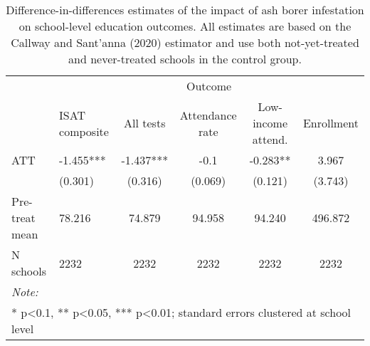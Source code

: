 \begin{table}[!h]

\caption{\label{tab:school-educ-table}Difference-in-differences estimates of the impact of ash borer infestation on school-level education outcomes. All estimates are based on the Callway and Sant'anna (2020) estimator and use both not-yet-treated and never-treated schools in the control group.}
\centering
\begin{tabular}[t]{llcccc}
\toprule
\multicolumn{1}{c}{ } & \multicolumn{5}{c}{Outcome} \\
\cmidrule(l{3pt}r{3pt}){2-6}
  & ISAT composite & All tests & Attendance rate & Low-income attend. & Enrollment\\
\midrule
ATT & -1.455*** & -1.437*** & -0.1 & -0.283** & 3.967\\
 & (0.301) & (0.316) & (0.069) & (0.121) & (3.743)\\
\midrule
Pre-treat mean & 78.216 & 74.879 & 94.958 & 94.240 & 496.872\\
N schools & 2232 & 2232 & 2232 & 2232 & 2232\\
\bottomrule
\multicolumn{6}{l}{\rule{0pt}{1em}\textit{Note: }}\\
\multicolumn{6}{l}{\rule{0pt}{1em}* p<0.1, ** p<0.05, *** p<0.01; standard errors clustered at school level}\\
\end{tabular}
\end{table}
